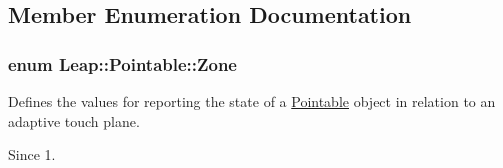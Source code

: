 \subsection{Member Enumeration Documentation}
\hypertarget{class_leap_1_1_pointable_ad6e50b9878b8c1fdf899b5e09721deef}{
\subsubsection[{Zone}]{\setlength{\rightskip}{0pt plus 5cm}enum {\bf Leap\+::\+Pointable\+::\+Zone}}}\label{class_leap_1_1_pointable_ad6e50b9878b8c1fdf899b5e09721deef}
Defines the values for reporting the state of a \hyperlink{class_leap_1_1_pointable}{Pointable} object in relation to an adaptive touch plane. \begin{DoxySince}{Since}
1. 
\end{DoxySince}
